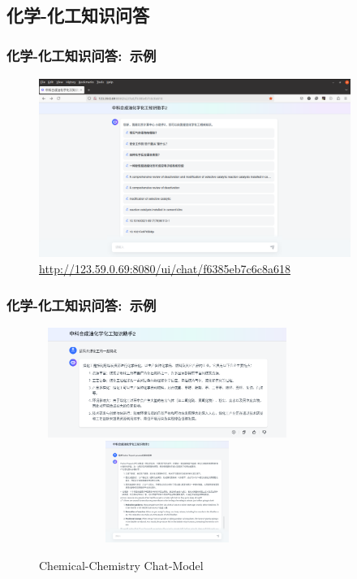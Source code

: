 \subsection{化学-化工知识问答}
\begin{frame}
	\frametitle{化学-化工知识问答:~示例}	
\begin{figure}[h!]
\centering
\includegraphics[height=2.30in,width=4.00in,viewport=0 0 1528 875,clip]{Figures/MaxKB_Chem.png}
\caption{\tiny\textrm{\url{http://123.59.0.69:8080/ui/chat/f6385eb7c6c8a618}}}%
\label{Fig:MaxKB_Chem}
\end{figure}
\end{frame}

\begin{frame}
	\frametitle{化学-化工知识问答:~示例}	
\begin{figure}[h!]
\centering
\vskip -8pt
\includegraphics[height=1.40in,width=3.30in,viewport=0 0 978 447,clip]{Figures/Allma_MaxKB-1.png}
\includegraphics[height=1.30in,width=3.30in,viewport=0 342 924 759,clip]{Figures/Allma_MaxKB-2.png}
\caption{\tiny\textrm{Chemical-Chemistry Chat-Model}}%
\label{Fig:MaxKB_Chat-Model-2}
\end{figure}
\end{frame}

